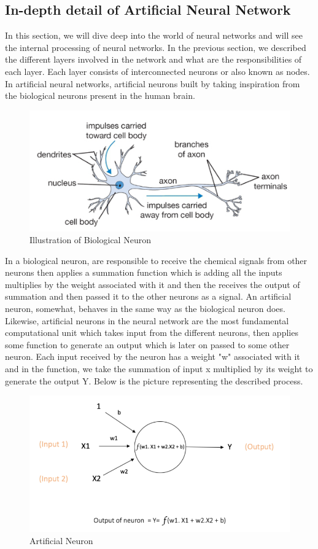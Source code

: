 \subsection{In-depth detail of Artificial Neural Network}
In this section, we will dive deep into the world of neural networks and will see the internal processing of neural networks. In the previous section, we described the different layers involved in the network and what are the responsibilities of each layer. Each layer consists of interconnected neurons or also known as nodes. In artificial neural networks, artificial neurons built by taking inspiration from the biological neurons present in the human brain.
\begin{figure}[H]
\centering
\includegraphics[scale=0.9]{images/Chapter2/neuron.PNG}
\caption{Illustration of Biological Neuron \cite{ann_arch}}
\label{neuron}
\end{figure}
\par
In a biological neuron,  are responsible to receive the chemical signals from other neurons then applies a summation function which is adding all the inputs multiplies by the weight associated with it and then the  receives the output of summation and then passed it to the other neurons as a signal. An artificial neuron, somewhat, behaves in the same way as the biological neuron does. Likewise, artificial neurons in the neural network are the most fundamental computational unit which takes input from the different neurons, then applies some function to generate an output which is later on passed to some other neuron. Each input received by the neuron has a weight "w" associated with it and in the function, we take the summation of input x multiplied by its weight to generate the output Y. Below is the picture representing the described process.
\begin{figure}[H]
\centering
\includegraphics[scale=0.9]{images/Chapter2/neuron-summation-func.png}
\caption{Artificial Neuron \cite{intro_to_nn}}
\label{neuron-sum-func}
\end{figure}
